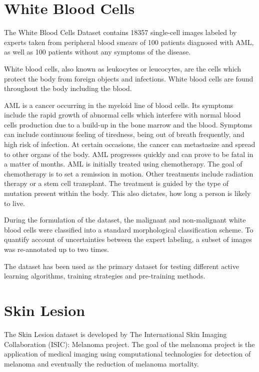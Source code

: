 \section{White Blood Cells}

The White Blood Cells Dataset contains 18357 single-cell images labeled by experts taken from peripheral blood smears of 100 patients diagnosed with AML, as well as 100 patients without any symptoms of the disease. 

White blood cells, also known as leukocytes or leucocytes, are the cells which protect the body from foreign objects and infections. White blood cells are found throughout the body including the blood.

AML is a cancer occurring in the myeloid line of blood cells. Its symptoms include the rapid growth of abnormal cells which interfere with normal blood cells production due to a build-up in the bone marrow and the blood. Symptoms can include continuous feeling of tiredness, being out of breath frequently, and high risk of infection. At certain occasions, the cancer can metastasize and spread to other organs of the body. AML progresses quickly and can prove to be fatal in a matter of months. AML is initially treated using chemotherapy. The goal of chemotherapy is to set a remission in motion. Other treatments include radiation therapy or a stem cell transplant. The treatment is guided by the type of mutation present within the body. This also dictates, how long a person is likely to live.

During the formulation of the dataset, the malignant and non-malignant white blood cells were classified into a standard morphological classification scheme. To quantify account of uncertainties between the expert labeling, a subset of images was re-annotated up to two times.

The dataset has been used as the primary dataset for testing different active learning algorithms, training strategies and pre-training methods.

\section{Skin Lesion}

The Skin Lesion dataset is developed by The International Skin Imaging Collaboration (ISIC): Melanoma project. The goal of the melanoma project is the application of medical imaging using computational technologies for detection of melanoma and eventually the reduction of melanoma mortality.

